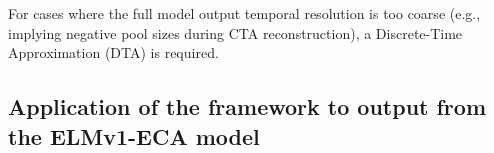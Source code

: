\documentclass[11pt,a4paper]{article}
\newcommand{\red}[1]{\textcolor{red}{#1}}
\begin{document}
    For cases where the full model output temporal resolution is too coarse (e.g., implying negative pool sizes during CTA reconstruction), a Discrete-Time Approximation (DTA) is required. %
%    
%

\subsection{Application of the framework to output from the ELMv1-ECA model}
   
\end{document}
